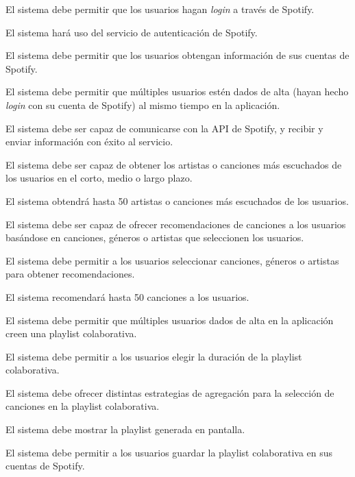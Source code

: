 \begin{functional}
    \item El sistema debe permitir que los usuarios hagan \textit{login} a través de Spotify.
    \begin{functional}
        \item El sistema hará uso del servicio de autenticación de Spotify.
    \end{functional}
    \item El sistema debe permitir que los usuarios obtengan información de sus cuentas de Spotify.
    \item El sistema debe permitir que múltiples usuarios estén dados de alta (hayan hecho \textit{login} con su cuenta de Spotify) al 
    mismo tiempo en la aplicación.
    \item El sistema debe ser capaz de comunicarse con la API de Spotify, y recibir y enviar información con éxito al servicio.
    \item El sistema debe ser capaz de obtener los artistas o canciones más escuchados de los usuarios en el corto, medio o largo plazo.
    \begin{functional}
        \item El sistema obtendrá hasta 50 artistas o canciones más escuchados de los usuarios.
    \end{functional} 
    \item El sistema debe ser capaz de ofrecer recomendaciones de canciones a los usuarios basándose en canciones, géneros o artistas que seleccionen los usuarios.
    \begin{functional}
        \item El sistema debe permitir a los usuarios seleccionar canciones, géneros o artistas para obtener recomendaciones.
        \item El sistema recomendará hasta 50 canciones a los usuarios.
    \end{functional} 
    
    \item El sistema debe permitir que múltiples usuarios dados de alta en la aplicación creen una playlist colaborativa.
    \begin{functional}
        \item El sistema debe permitir a los usuarios elegir la duración de la playlist colaborativa.
        \item El sistema debe ofrecer distintas estrategias de agregación para la selección de canciones en la playlist colaborativa.
        \item El sistema debe mostrar la playlist generada en pantalla.
        \item El sistema debe permitir a los usuarios guardar la playlist colaborativa en sus cuentas de Spotify.
    \end{functional} 
    
\end{functional}

